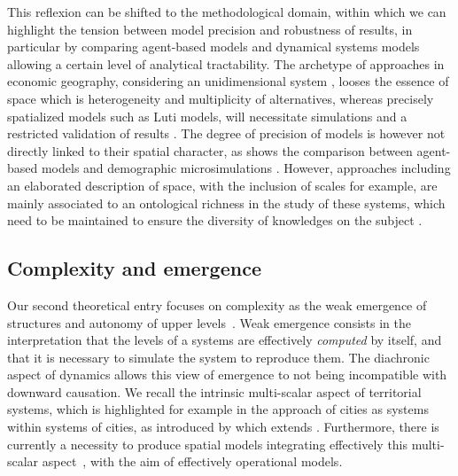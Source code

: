 \documentclass[fleqn,10pt]{wlscirep}
\begin{document}
This reflexion can be shifted to the methodological domain, within which we can highlight the tension between model precision and robustness of results, in particular by comparing agent-based models and dynamical systems models allowing a certain level of analytical tractability. The archetype of approaches in economic geography, considering an unidimensional system \cite{krugman1992dynamic}, looses the essence of space which is heterogeneity and multiplicity of alternatives, whereas precisely spatialized models such as Luti models, will necessitate simulations and a restricted validation of results \cite{bonnel2014survey}. The degree of precision of models is however not directly linked to their spatial character, as shows the comparison between agent-based models and demographic microsimulations \cite{birkin2011spatial}. However, approaches including an elaborated description of space, with the inclusion of scales for example, are mainly associated to an ontological richness in the study of these systems, which need to be maintained to ensure the diversity of knowledges on the subject \cite{sanders2018survival}.




\subsection*{Complexity and emergence}


Our second theoretical entry focuses on complexity as the weak emergence of structures and autonomy of upper levels~\cite{bedau2002downward}. Weak emergence consists in the interpretation that the levels of a systems are effectively \emph{computed} \cite{morin1980methode} by itself, and that it is necessary to simulate the system to reproduce them. The diachronic aspect of dynamics allows this view of emergence to not being incompatible with downward causation. We recall the intrinsic multi-scalar aspect of territorial systems, which is highlighted for example in the approach of cities as systems within systems of cities, as introduced by \cite{pumain1997pour} which extends \cite{berry1964cities}. Furthermore, there is currently a necessity to produce spatial models integrating effectively this multi-scalar aspect~\cite{rozenblat2018conclusion}, with the aim of effectively operational models.
\end{document}
